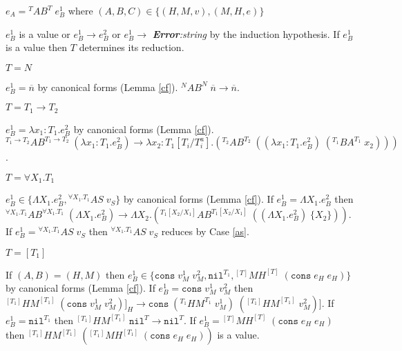 \begin{case}
\label{ab}
$e_{A}={^{T}A}B^{T}\;e_{B}^{1}$ where $(A,B,C)\in\lbrace(H,M,v),(M,H,e)\rbrace$

$e_{B}^{1}$ is a value or $e_{B}^{1}\rightarrow e_{B}^{2}$ or $e_{B}^{1}\rightarrow$ \emph{\textbf{Error}:\;string} by the induction hypothesis.  If $e_{B}^{1}$ is a value then $T$ determines its reduction.
\begin{subcase}
$T=N$

$e_{B}^{1}=\overline{n}$ by canonical forms (Lemma \ref{cf}).  $^{N}AB^{N}\;\overline{n}\rightarrow\overline{n}$.
\end{subcase}
\begin{subcase}
$T=T_{1}\rightarrow T_{2}$

$e_{B}^{1}=\lambda x_{1}:T_{1}.e_{B}^{2}$ by canonical forms (Lemma \ref{cf}).  $^{T_{1}\rightarrow T_{2}}AB^{T_{1}\rightarrow T_{2}}\;(\lambda x_{1}:T_{1}.e_{B}^{2})\rightarrow\lambda x_{2}:T_{1}[T_{i}/T^{a}_{i}].(^{T_{2}}AB^{T_{2}}\;((\lambda x_{1}:T_{1}.e_{B}^{2})\;(^{T_{1}}BA^{T_{1}}\;x_{2})))$.
\end{subcase}
\begin{subcase}
$T=\forall X_{1}.T_{1}$

$e_{B}^{1}\in\lbrace\Lambda X_{1}.e_{B}^{2},{^{\forall X_{1}.T_{1}}A}S\;v_{S}\rbrace$ by canonical forms (Lemma \ref{cf}).  If $e_{B}^{1}=\Lambda X_{1}.e_{B}^{2}$ then $^{\forall X_{1}.T_{1}}AB^{\forall X_{1}.T_{1}}\;(\Lambda X_{1}.e_{B}^{2})\rightarrow\Lambda X_{2}.(^{T_{1}[X_{2}/X_{1}]}AB^{T_{1}[X_{2}/X_{1}]}\;((\Lambda X_{1}.e_{B}^{2})\;\lbrace X_{2}\rbrace))$.  If $e_{B}^{1}={^{\forall X_{1}.T_{1}}A}S\;v_{S}$ then ${^{\forall X_{1}.T_{1}}A}S\;v_{S}$ reduces by Case \ref{as}.
\end{subcase}
\begin{subcase}
$T=[T_{1}]$

If $(A,B)=(H,M)$ then $e_{B}^{1}\in\lbrace\mathtt{cons}\;v_{M}^{1}\;v_{M}^{2},\mathtt{nil}^{T_{1}},{^{[T]}M}H^{[T]}\;(\mathtt{cons}\;e_{H}\;e_{H})\rbrace$ by canonical forms (Lemma \ref{cf}).  If $e_{B}^{1}=\mathtt{cons}\;v_{M}^{1}\;v_{M}^{2}$ then $^{[T_{1}]}HM^{[T_{1}]}\;(\mathtt{cons}\;v_{M}^{1}\;v_{M}^{2})]_{H}\rightarrow\mathtt{cons}\;(^{T_{1}}HM^{T_{1}}\;v_{M}^{1})\;(^{[T_{1}]}HM^{[T_{1}]}\;v_{M}^{2})]$.  If $e_{B}^{1}=\mathtt{nil}^{T_{1}}$ then $^{[T_{1}]}HM^{[T_{1}]}\;\mathtt{nil}^{T}\rightarrow\mathtt{nil}^{T}$.  If $e_{B}^{1}={^{[T]}M}H^{[T]}\;(\mathtt{cons}\;e_{H}\;e_{H})$ then $^{[T_{1}]}HM^{[T_{1}]}\;(^{[T_{1}]}MH^{[T_{1}]}\;(\mathtt{cons}\;e_{H}\;e_{H}))$ is a value.


\end{subcase}
\end{case}

